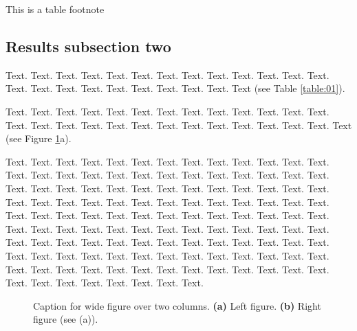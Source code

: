 \documentclass[a4,center,fleqn]{NAR}
\begin{document}
\begin{table}[b]
{This is a table footnote}
\end{table}


\subsection{Results subsection two}

Text.  Text. Text. Text. Text. Text. Text. Text. Text. Text. Text.
Text. Text. Text. Text. Text. Text. Text. Text. Text. Text. Text.
Text (see Table \ref{table:01}).

Text. Text. Text. Text. Text. Text.
Text. Text. Text. Text. Text. Text. Text. Text. Text. Text. Text.
Text. Text. Text. Text. Text. Text. Text. Text. Text.
Text (see Figure \ref{NAR-fig2}a).

Text. Text. Text. Text. Text.
Text. Text. Text. Text. Text. Text. Text. Text. Text. Text. Text.
Text. Text. Text. Text. Text. Text. Text. Text. Text. Text. Text.
Text. Text. Text. Text. Text. Text. Text. Text. Text. Text. Text.
Text. Text. Text. Text. Text. Text. Text. Text. Text. Text. Text.
Text. Text. Text. Text. Text. Text. Text. Text. Text. Text. Text.
Text. Text. Text. Text. Text. Text. Text. Text. Text. Text. Text.
Text. Text. Text. Text. Text. Text. Text. Text. Text. Text. Text.
Text. Text. Text. Text. Text. Text. Text. Text. Text. Text. Text.
Text. Text. Text. Text. Text. Text. Text. Text. Text. Text. Text.
Text. Text. Text. Text. Text. Text. Text. Text. Text. Text. Text.
Text. Text. Text. Text. Text. Text. Text. Text. Text. Text.

\begin{figure}[t]
\begin{center}

\end{center}
\caption{Caption for wide figure over two columns.
\textbf{(a)} Left figure.
\textbf{(b)} Right figure (see (a)).
}
\label{NAR-fig2}
\end{figure}
\end{document}
